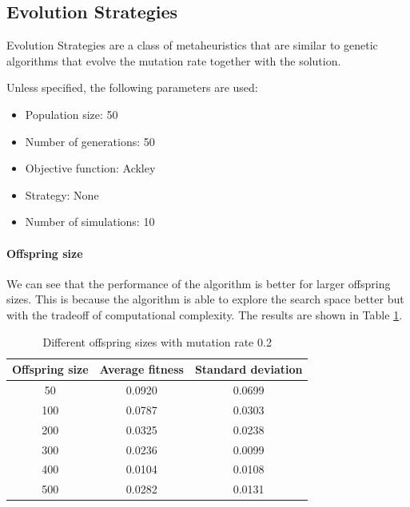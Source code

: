 \subsection{Evolution Strategies}
Evolution Strategies are a class of metaheuristics that are similar to genetic algorithms that evolve the mutation rate together with the solution.

Unless specified, the following parameters are used:
\begin{itemize}
    \item Population size: 50
    \item Number of generations: 50
    \item Objective function: Ackley
    \item Strategy: None
    \item Number of simulations: 10
\end{itemize}

\paragraph*{Offspring size}
We can see that the performance of the algorithm is better for larger offspring sizes. This is because the algorithm is able to explore the search space better but with the tradeoff of computational complexity. The results are shown in Table \ref{tab:es-offspring_size}.
\begin{table}[H]
    \centering
    \begin{tabular}{|c|c|c|}
        Offspring size & Average fitness & Standard deviation \\ \hline
        50             & 0.0920          & 0.0699             \\
        100            & 0.0787          & 0.0303             \\
        200            & 0.0325          & 0.0238             \\
        300            & 0.0236          & 0.0099             \\
        400            & 0.0104          & 0.0108             \\
        500            & 0.0282          & 0.0131             \\
    \end{tabular}
    \caption{Different offspring sizes with mutation rate 0.2}
    \label{tab:es-offspring_size}
\end{table}

